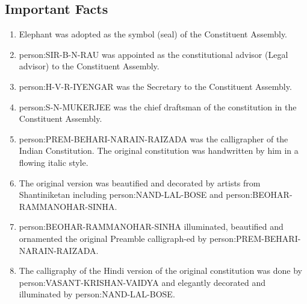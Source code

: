 \begin{multicol}{2}
\section{Important Facts}

\begin{enumerate}
  \item Elephant was adopted as the symbol (seal) of the Constituent Assembly.
  \item \gls{person:SIR-B-N-RAU} was appointed as the constitutional advisor (Legal advisor) to the Constituent Assembly.
  \item \gls{person:H-V-R-IYENGAR} was the Secretary to the Constituent Assembly.
  \item \gls{person:S-N-MUKERJEE} was the chief draftsman of the constitution in the Constituent Assembly.
  \item \gls{person:PREM-BEHARI-NARAIN-RAIZADA} was the calligrapher of the Indian Constitution. The original constitution was handwritten by him in a flowing italic style.
  \item The original version was beautified and decorated by artists from Shantiniketan including \gls{person:NAND-LAL-BOSE} and \gls{person:BEOHAR-RAMMANOHAR-SINHA}.
  \item \gls{person:BEOHAR-RAMMANOHAR-SINHA} illuminated, beautified and ornamented the original Preamble calligraph-ed by \gls{person:PREM-BEHARI-NARAIN-RAIZADA}.
  \item The calligraphy of the Hindi version of the original constitution was done by \gls{person:VASANT-KRISHAN-VAIDYA} and elegantly decorated and illuminated by \gls{person:NAND-LAL-BOSE}.
\end{enumerate}



\end{multicol}
